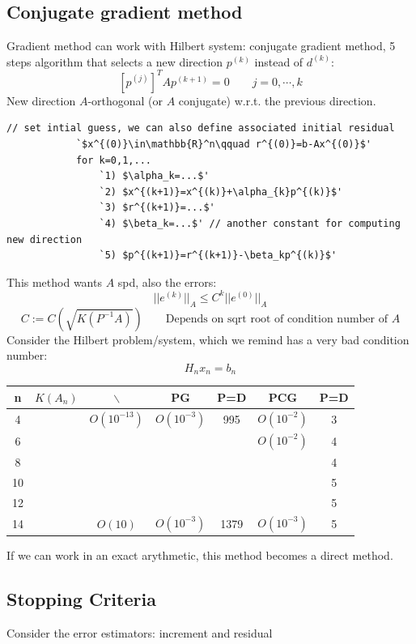 \subsection{Conjugate gradient method}
    Gradient method can work with Hilbert system: conjugate gradient method, 5 steps algorithm that selects a new direction $p^{(k)}$ instead of $d^{(k)}$:
    $$
    \left[p^{(j)}\right]^TAp^{(k+1)}=0
    \qquad j = 0,\cdots,k
    $$
    New direction $A$-orthogonal (or $A$ conjugate) w.r.t. the previous direction.
    \begin{center}
        \begin{lstlisting}[escapeinside=`']
            // set intial guess, we can also define associated initial residual
            `$x^{(0)}\in\mathbb{R}^n\qquad r^{(0)}=b-Ax^{(0)}$'
            for k=0,1,...
                `1) $\alpha_k=...$'
                `2) $x^{(k+1)}=x^{(k)}+\alpha_{k}p^{(k)}$'
                `3) $r^{(k+1)}=...$'
                `4) $\beta_k=...$' // another constant for computing new direction
                `5) $p^{(k+1)}=r^{(k+1)}-\beta_kp^{(k)}$'
        \end{lstlisting}
    \end{center}
    This method wants $A$ spd, also the errors:
    $$
    ||e^{(k)}||_A\leq
    C^k||e^{(0)}||_A
    $$
    $$
    C:=C\left(\sqrt{K(P^{-1}A)}\right)\qquad\text{Depends on sqrt root of condition number of $A$}
    $$
    Consider the Hilbert problem/system, which we remind has a very bad condition number:
    $$
    H_nx_n=b_n
    $$
    \begin{center}        
        \begin{tabular}{c|c|c|c c|c c}
            \textbf{n} & $K(A_n)$ & $\backslash$ & PG & P=D & PCG & P=D\\ \midrule
            4 & & $O(10^{-13})$ & $O(10^{-3})$ & 995 & $O(10^{-2})$ & 3\\ \hline
            6  & &  & & & $O(10^{-2})$ & 4\\ \hline
            8  & &  & & & & 4\\ \hline
            10 & &  & & & & 5\\ \hline
            12 & &  & & & & 5\\ \hline
            14 & & $O(10)$ & $O(10^{-3})$ & 1379 & $O(10^{-3})$ & 5
        \end{tabular}
    \end{center}
    If we can work in an exact arythmetic, this method becomes a direct method.

    \subsection{Stopping Criteria}
    Consider the error estimators: increment and residual
